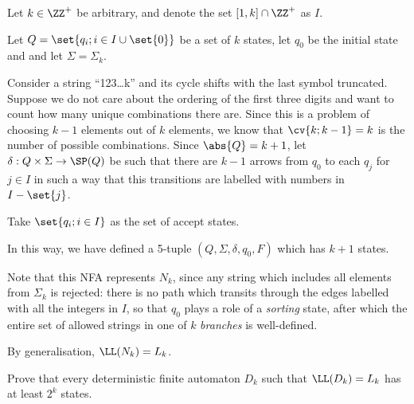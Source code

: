 \documentclass[11pt]{scrartcl}
\begin{document}
\begin{soln}
  \hfill

  Let $k\in \ZZ^+$ be arbitrary, and denote the set $[1, k]\cap\ZZ^+$
  as $I$.

  Let $Q = \set{q_i; i\in I\cup \set{0}}$ be a set of $k$ states, let
  $q_0$ be the initial state and and let $\Sigma = \Sigma_k$.

  Consider a string ``123\dots k'' and its cycle shifts with the last
  symbol truncated. Suppose we do not care about the ordering of the
  first three digits and want to count how many unique combinations
  there are. Since this is a problem of choosing $k-1$ elements out of
  $k$ elements, we know that $\cv{k;k-1} = k$ is the number of
  possible combinations. Since $\abs{Q} = k+1$, let
  $\delta: Q\times \Sigma \to \SP(Q)$ be such that there are $k-1$
  arrows from $q_0$ to each $q_j$ for $j\in I$ in such a way that this
  transitions are labelled with numbers in $I-\set{j}$.


  Take $\set{q_i; i\in I}$ as the set of accept states.

  In this way, we have defined a 5-tuple $(Q, \Sigma, \delta, q_0, F)$
  which has $k+1$ states.

  Note that this NFA represents $N_k$, since any string which includes
  all elements from $\Sigma_k$ is rejected: there is no path which
  transits through the edges labelled with all the integers in $I$, so
  that $q_0$ plays a role of a \textit{sorting} state, after which the
  entire set of allowed strings in one of $k$ \textit{branches} is
  well-defined.

  By generalisation, $\LL(N_k)=L_k$.
\end{soln}
\begin{problem*}
  \hfill
  Prove that every deterministic finite automaton $D_{k}$ such that
  $\LL(D_k) = L_k$ has at least $2^k$ states.
\end{problem*}
\end{document}
